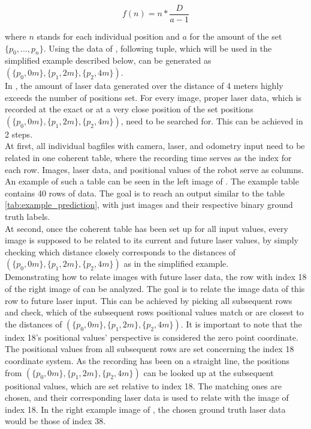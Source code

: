 \begin{equation}
\label{eqn:8} 
f(n) = n * \frac{D}{a-1}
\end{equation}

where $n$ stands for each individual position and $a$ for the amount of the set $\{p_{0},...,p_{n}\}$. Using the data of , following tuple, which will be used in the simplified example described below, can be generated as $(\{p_{0},0m\},\{p_{1},2m\},\{p_{2},4m\})$.\\

In , the amount of laser data generated over the distance of 4 meters highly exceeds the number of positions set. For every image, proper laser data, which is recorded at the exact or at a very close position of the set positions $(\{p_{0},0m\},\{p_{1},2m\},\{p_{2},4m\})$, need to be searched for. This can be achieved in 2 steps.\\ 

At first, all individual bagfiles with camera, laser, and odometry input need to be related in one coherent table, where the recording time serves as the index for each row. Images, laser data, and positional values of the robot serve as columns. An example of such a table can be seen in the left image of . The example table contains 40 rows of data. The goal is to reach an output similar to the table \ref{tab:example_prediction}, with just images and their respective binary ground truth labels.\\

At second, once the coherent table has been set up for all input values, every image is supposed to be related to its current and future laser values, by simply checking which distance closely corresponds to the distances of $(\{p_{0},0m\},\{p_{1},2m\},\{p_{2},4m\})$ as in the simplified example.\\

Demonstrating how to relate images with future laser data, the row with index 18 of the right image of  can be analyzed. The goal is to relate the image data of this row to future laser input. This can be achieved by picking all subsequent rows and check, which of the subsequent rows positional values match or are closest to the distances of
$(\{p_{0},0m\},\{p_{1},2m\},\{p_{2},4m\})$. It is important to note that the index 18's positional values' perspective is considered the zero point coordinate. The positional values from all subsequent rows are set concerning the index 18 coordinate system. As the recording has been on a straight line, the positions from $(\{p_{0},0m\},\{p_{1},2m\},\{p_{2},4m\})$ can be looked up at the subsequent positional values, which are set relative to index 18. The matching ones are chosen, and their corresponding laser data is used to relate with the image of index 18. In the right example image of , the chosen ground truth laser data would be those of index 38.\\

